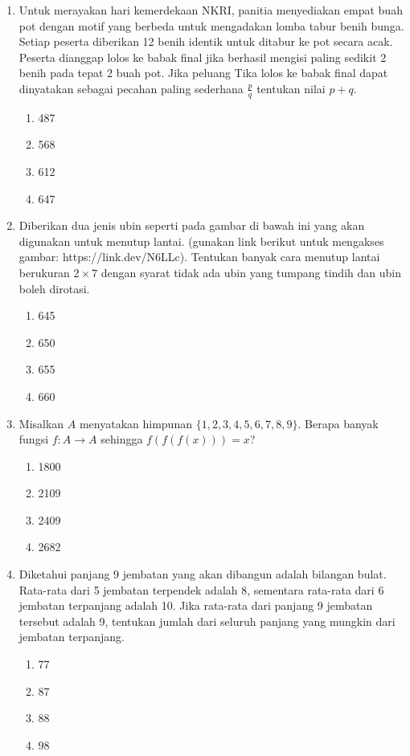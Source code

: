\documentclass[12pt]{article}
\begin{document}
\begin{enumerate}
    \item Untuk merayakan hari kemerdekaan NKRI, panitia menyediakan empat buah pot dengan motif yang berbeda untuk mengadakan lomba tabur benih bunga. Setiap peserta diberikan 12 benih identik untuk ditabur ke pot secara acak. Peserta dianggap lolos ke babak final jika berhasil mengisi paling sedikit 2 benih pada tepat 2 buah pot. Jika peluang Tika lolos ke babak final dapat dinyatakan sebagai pecahan paling sederhana $\frac{p}{q}$ tentukan nilai $p+q$.
    \begin{enumerate}
        \item 487
        \item 568
        \item 612
        \item 647
    \end{enumerate}

    \item Diberikan dua jenis ubin seperti pada gambar di bawah ini yang akan digunakan untuk menutup lantai. (gunakan link berikut untuk mengakses gambar: https://link.dev/N6LLc). Tentukan banyak cara menutup lantai berukuran $2\times7$ dengan syarat tidak ada ubin yang tumpang tindih dan ubin boleh dirotasi.
    \begin{enumerate}
        \item 645
        \item 650
        \item 655
        \item 660
    \end{enumerate}

    \item Misalkan $A$ menyatakan himpunan $\{1,2,3,4,5,6,7,8,9\}$. Berapa banyak fungsi $f:A\rightarrow A$ sehingga $f(f(f(x)))=x$?
    \begin{enumerate}
        \item 1800
        \item 2109
        \item 2409
        \item 2682
    \end{enumerate}

    \item Diketahui panjang 9 jembatan yang akan dibangun adalah bilangan bulat. Rata-rata dari 5 jembatan terpendek adalah 8, sementara rata-rata dari 6 jembatan terpanjang adalah 10. Jika rata-rata dari panjang 9 jembatan tersebut adalah 9, tentukan jumlah dari seluruh panjang yang mungkin dari jembatan terpanjang.
    \begin{enumerate}
        \item 77
        \item 87
        \item 88
        \item 98
    \end{enumerate}

\end{enumerate}
\end{document}
